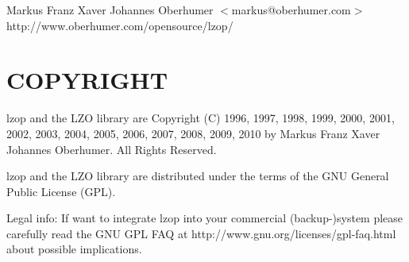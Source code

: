 Markus Franz Xaver Johannes Oberhumer
$<$markus@oberhumer.com$>$
http://www.oberhumer.com/opensource/lzop/

\section{COPYRIGHT\label{COPYRIGHT}}


lzop and the LZO library are
Copyright (C) 1996, 1997, 1998, 1999, 2000, 2001, 2002, 2003, 2004, 2005,
2006, 2007, 2008, 2009, 2010 by Markus Franz Xaver Johannes Oberhumer.
All Rights Reserved.



lzop and the LZO library are distributed under the terms
of the GNU General Public License (GPL).



Legal info: If want to integrate lzop into your commercial (backup-)system
please carefully read the GNU GPL FAQ at http://www.gnu.org/licenses/gpl-faq.html
about possible implications.

